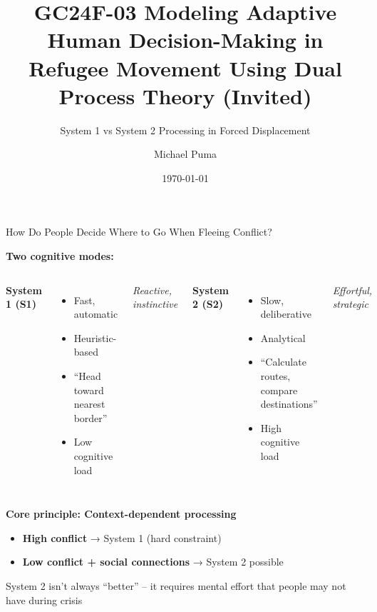 \documentclass[aspectratio=169]{beamer}
\title[GC24F-03]{GC24F-03 Modeling Adaptive Human Decision-Making in Refugee Movement Using Dual Process Theory (Invited)}
\subtitle{System 1 vs System 2 Processing in Forced Displacement}
\author{Michael Puma}
\institute{Columbia University Climate School\\Center for Climate Systems Research}
\date{\today}
\begin{document}
\begin{frame}
\titlepage
\end{frame}

\begin{frame}{How Do People Decide Where to Go When Fleeing Conflict?}

\textbf{Two cognitive modes:}

\begin{columns}[T]
\textbf{System 1 (S1)}
\begin{itemize}
    \item Fast, automatic
    \item Heuristic-based
    \item ``Head toward nearest border''
    \item Low cognitive load
\end{itemize}

\vspace{0.5em}
\textit{Reactive, instinctive}

\textbf{System 2 (S2)}
\begin{itemize}
    \item Slow, deliberative
    \item Analytical
    \item ``Calculate routes, compare destinations''
    \item High cognitive load
\end{itemize}

\vspace{0.5em}
\textit{Effortful, strategic}
\end{columns}

\vspace{1em}

\textbf{Core principle: Context-dependent processing}
\begin{itemize}
    \item \textbf{High conflict} → System 1 (hard constraint)
    \item \textbf{Low conflict + social connections} → System 2 possible
\end{itemize}

\vspace{0.5em}

\centering
\alert{System 2 isn't always ``better'' – it requires mental effort that people may not have during crisis}

\end{frame}
\end{document}
